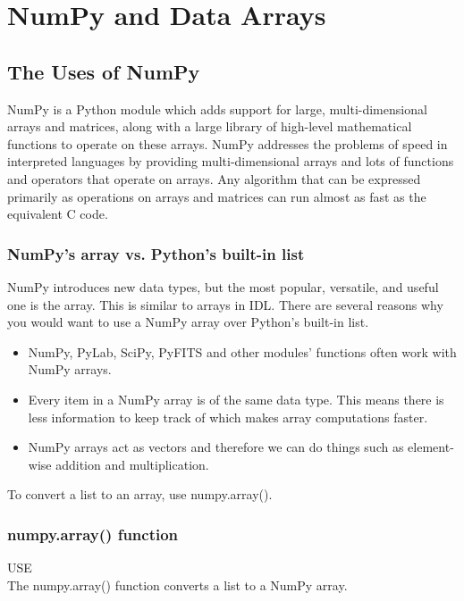 \chapter{NumPy and Data Arrays}
\label{ch:numpy}

\section{The Uses of NumPy }
NumPy is a Python module which adds support for large,
multi-dimensional arrays and matrices, along with a large library of
high-level mathematical functions to operate on these arrays. NumPy
addresses the problems of speed in interpreted languages by providing
multi-dimensional arrays and lots of functions and operators that
operate on arrays. Any algorithm that can be expressed primarily as
operations on arrays and matrices can run almost as fast as the
equivalent C code.

\subsection{NumPy's array vs. Python's built-in list}
NumPy introduces new data types, but the most popular, versatile, and
useful one is the array.  This is similar to arrays in IDL.  There
are several reasons why you would want to use a NumPy array over
Python's built-in list.
\begin{itemize}
\item NumPy, PyLab, SciPy, PyFITS and other modules' functions often
  work with NumPy arrays.
\item Every item in a NumPy array is of the same data type.  This
  means there is less information to keep track of which makes array
  computations faster.
\item NumPy arrays act as vectors and therefore we can do things such
  as element-wise addition and multiplication.
\end{itemize}

To convert a list to an array, use {\sf \small numpy.array()}.

\subsection{ {\sf numpy.array() } function}
  {\color{blue} {\sf\small USE}} \\
  The {\sf\small numpy.array()} function converts a list to a NumPy
  array.  

